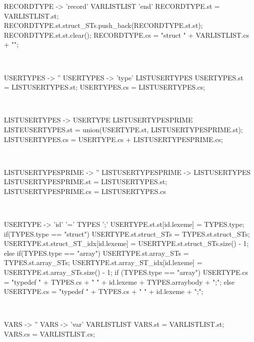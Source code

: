 \begin{verbbox}[\scriptsize]
RECORDTYPE -> 'record' VARLISTLIST 'end'
{
RECORDTYPE.st = VARLISTLIST.st;
RECORDTYPE.st.struct_STs.push_back(RECORDTYPE.st.st);
RECORDTYPE.st.st.clear();
RECORDTYPE.cs = "struct {\n" + VARLISTLIST.cs + "\n}";
}
\end{verbbox}
\theverbbox\\

\begin{verbbox}[\scriptsize]
USERTYPES -> '' {}
USERTYPES -> 'type' LISTUSERTYPES
{
USERTYPES.st = LISTUSERTYPES.st;
USERTYPES.cs  = LISTUSERTYPES.cs;
}
\end{verbbox}
\theverbbox\\

\begin{verbbox}[\scriptsize]
LISTUSERTYPES -> USERTYPE LISTUSERTYPESPRIME
{
LISTEUSERTYPES.st = union(USERTYPE.st, LISTUSERTYPESPRIME.st);
LISTUSERTYPES.cs = USERTYPE.cs + LISTUSERTYPESPRIME.cs;
}
\end{verbbox}
\theverbbox\\

\begin{verbbox}[\scriptsize]
LISTUSERTYPESPRIME -> '' {}
LISTUSERTYPESPRIME -> LISTUSERTYPES
{
LISTUSERTYPESPRIME.st = LISTUSERTYPES.st;
LISTUSERTYPESPRIME.cs = LISTUSERTYPES.cs
}
\end{verbbox}
\theverbbox\\

\begin{verbbox}[\scriptsize]
USERTYPE -> 'id' '=' TYPES ';'
{
USERTYPE.st.st[id.lexeme] = TYPES.type; 
if(TYPES.type == "struct") {
    USERTYPE.st.struct_STs = TYPES.st.struct_STs;
    USERTYPE.st.struct_ST_idx[id.lexeme] = USERTYPE.st.struct_STs.size() - 1;
} else if(TYPES.type == "array") {
    USERTYPE.st.array_STs = TYPES.st.array_STs;
    USERTYPE.st.array_ST_idx[id.lexeme] = USERTYPE.st.array_STs.size() - 1;
}
if (TYPES.type == "array") {
    USERTYPE.cs = "typedef " + TYPES.cs + " " + id.lexeme + TYPES.arraybody + ";\n";
} else {
    USERTYPE.cs = "typedef " + TYPES.cs + " " + id.lexeme + ";\n";
}
}
\end{verbbox}
\theverbbox\\

\begin{verbbox}[\scriptsize]
VARS -> '' {}
VARS -> 'var' VARLISTLIST
{
VARS.st = VARLISTLIST.st;
VARS.cs = VARLISTLIST.cs;
}
\end{verbbox}
\theverbbox\\

